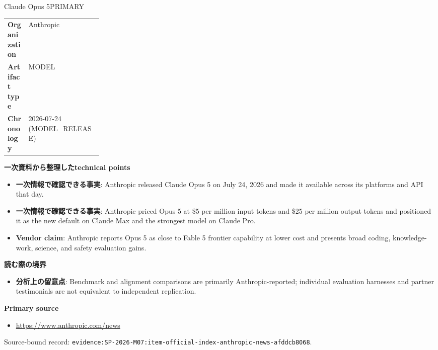 \begin{technicalnote}{Claude Opus 5}{PRIMARY}
\begin{tabularx}{\linewidth}{@{}>{\bfseries}p{0.22\linewidth}X@{}}
Organization & Anthropic \\
Artifact type & MODEL \\
Chronology & 2026-07-24 (MODEL\_RELEASE) \\
\end{tabularx}
\smallskip
{\bfseries 一次資料から整理したtechnical points}
\begin{itemize}[leftmargin=1.5em,itemsep=0.35em]
\item \textbf{一次情報で確認できる事実}: Anthropic released Claude Opus 5 on July 24, 2026 and made it available across its platforms and API that day.
\item \textbf{一次情報で確認できる事実}: Anthropic priced Opus 5 at \$5 per million input tokens and \$25 per million output tokens and positioned it as the new default on Claude Max and the strongest model on Claude Pro.
\item \textbf{Vendor claim}: Anthropic reports Opus 5 as close to Fable 5 frontier capability at lower cost and presents broad coding, knowledge-work, science, and safety evaluation gains.
\end{itemize}
{\bfseries 読む際の境界}
\begin{itemize}[leftmargin=1.5em,itemsep=0.35em]
\item \textbf{分析上の留意点}: Benchmark and alignment comparisons are primarily Anthropic-reported; individual evaluation harnesses and partner testimonials are not equivalent to independent replication.
\end{itemize}
{\bfseries Primary source}
\begin{itemize}[leftmargin=1.5em,itemsep=0.25em]
\item \url{https://www.anthropic.com/news}
\end{itemize}
{\scriptsize\color{SurveyMuted}Source-bound record: \texttt{evidence:SP-2026-M07:item-official-index-anthropic-news-afddcb8068}.}
\end{technicalnote}
\medskip

